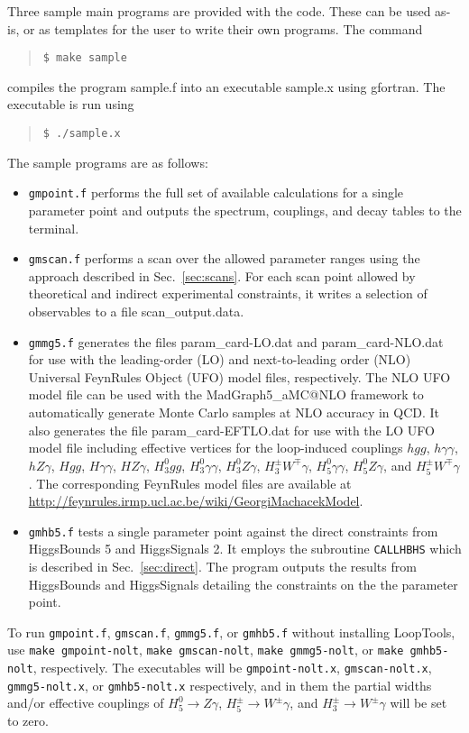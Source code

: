 \documentclass[11pt]{article}
\begin{document}
Three sample main programs are provided with the code.  These can be used as-is, or as templates for the user to write their own programs.  The command
\begin{quotation}
	{\tt \$ make sample}
\end{quotation}
compiles the program sample.f into an executable sample.x using gfortran.  The executable is run using
\begin{quotation}
	{\tt \$ ./sample.x}
\end{quotation}
The sample programs are as follows:
\begin{itemize}
\item {\tt gmpoint.f} performs the full set of available calculations for a single parameter point and outputs the spectrum, couplings, and decay tables to the terminal.
\item {\tt gmscan.f} performs a scan over the allowed parameter ranges using the approach described in Sec.~\ref{sec:scans}.  For each scan point allowed by theoretical and indirect experimental constraints, it writes a selection of observables to a file scan\_output.data.
\item {\tt gmmg5.f} generates the files param\_card-LO.dat and param\_card-NLO.dat for use with the leading-order (LO) and next-to-leading order (NLO) Universal FeynRules Object (UFO) model files, respectively.  The NLO UFO model file can be used with the MadGraph5\_aMC@NLO framework to automatically generate Monte Carlo samples at NLO accuracy in QCD.  It also generates the file param\_card-EFTLO.dat for use with the LO UFO model file including effective vertices for the loop-induced couplings $hgg$, $h\gamma\gamma$, $hZ\gamma$, $Hgg$, $H\gamma\gamma$, $HZ\gamma$, $H_3^0gg$, $H_3^0\gamma\gamma$, $H_3^0Z\gamma$, $H_3^{\pm}W^{\mp}\gamma$, $H_5^0\gamma\gamma$, $H_5^0 Z\gamma$, and $H_5^{\pm}W^{\mp} \gamma$.
The corresponding FeynRules model files are available at \url{http://feynrules.irmp.ucl.ac.be/wiki/GeorgiMachacekModel}.
\item {\tt gmhb5.f} tests a single parameter point against the direct constraints from HiggsBounds 5 and HiggsSignals 2. It employs the subroutine {\tt CALLHBHS} which is described in Sec.~\ref{sec:direct}. The program outputs the results from HiggsBounds and HiggsSignals detailing the constraints on the the parameter point.
\end{itemize}

To run {\tt gmpoint.f}, {\tt gmscan.f}, {\tt gmmg5.f}, or {\tt gmhb5.f} without installing LoopTools, use {\tt make gmpoint-nolt}, {\tt make gmscan-nolt}, {\tt make gmmg5-nolt}, or {\tt make gmhb5-nolt}, respectively.  The executables will be {\tt gmpoint-nolt.x}, {\tt gmscan-nolt.x}, {\tt gmmg5-nolt.x}, or {\tt gmhb5-nolt.x} respectively, and in them the partial widths and/or effective couplings of $H_5^0 \to Z\gamma$, $H_5^{\pm} \to W^{\pm} \gamma$, and $H_3^{\pm} \to W^{\pm} \gamma$ will be set to zero.
\end{document}
